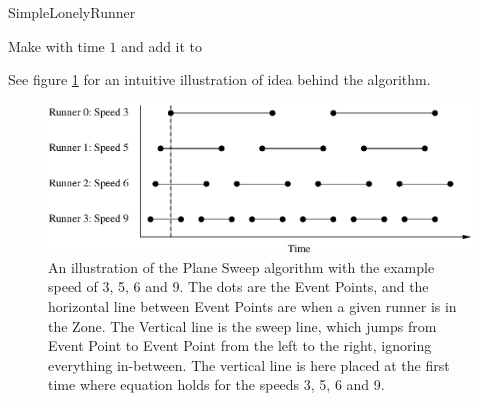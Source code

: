 \begin{algorithm}[H]
  \caption{SimpleLonelyRunner\label{simpleLonelyRunner}}
  \highlights
  
  Make \finish with time $1$ and add it to \li

  
\end{algorithm}

See figure \ref{algoIlluImg} for an intuitive illustration of idea behind the algorithm. 

\begin{figure}[H]
  \centering
  \includegraphics[width=\textwidth]{./images/algoIlluEPS}
  \caption{\label{algoIlluImg}An illustration of the Plane Sweep algorithm with the example speed of 3, 5, 6 and 9. The dots are the Event Points, and the horizontal line between Event Points are when a given runner is in the Zone. The Vertical line is the sweep line, which jumps from Event Point to Event Point from the left to the right, ignoring everything in-between. The vertical line is here placed at the first time where equation  holds for the speeds 3, 5, 6 and 9.}
\end{figure}


